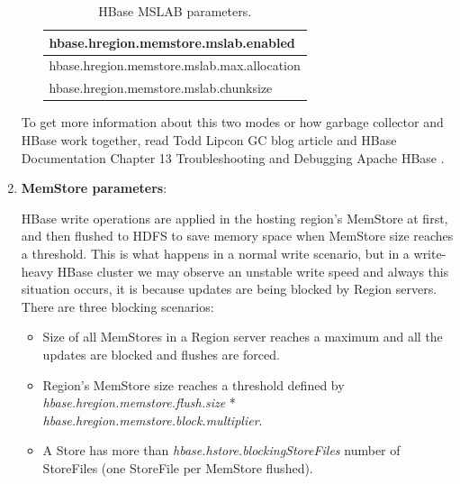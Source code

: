 \begin{enumerate}
\begin{enumerate}
\par
\begin{table}[htbp]
\begin{center}
\begin{tabular}{|l|}
\hline
hbase.hregion.memstore.mslab.enabled  \\ \hline
hbase.hregion.memstore.mslab.max.allocation \\ \hline
hbase.hregion.memstore.mslab.chunksize \\ \hline
\end{tabular}
\label{HBase MSLAB parameters.}
\caption{HBase MSLAB parameters.}
\end{center}
\end{table}

\end{enumerate}


To get more information about this two modes or how garbage collector and HBase work together, read Todd Lipcon GC blog article \cite{MSLABexplained} and HBase Documentation Chapter 13 Troubleshooting and Debugging Apache HBase \cite{ApacheHBaseLogs}.

\item \textbf{MemStore parameters}:
\par
HBase write operations are applied in the hosting region's MemStore at first, and then flushed to HDFS to save memory space when MemStore size reaches a threshold. This is what happens in a normal write scenario, but in a write-heavy HBase cluster we may observe an unstable write speed and always this situation occurs, it is because updates are being blocked by Region servers. There are three blocking scenarios:
\begin{itemize}
\item Size of all MemStores in a Region server reaches a maximum and all the updates are blocked and flushes are forced.
\item Region's MemStore size reaches a threshold defined by \textit{hbase.hregion.memstore.flush.size} * \textit{hbase.hregion.memstore.block.multiplier}.
\item A Store has more than \textit{hbase.hstore.blockingStoreFiles} number of StoreFiles (one StoreFile per MemStore flushed).
\end{itemize}


\end{enumerate}
